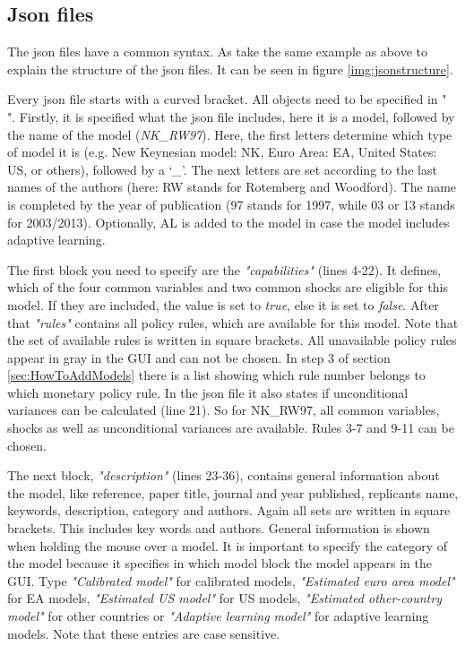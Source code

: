 \subsection*{Json files}
The json files have a common syntax. As take the same example as above to explain the structure of the json files. It can be seen in figure \ref{img:jsonstructure}.

Every json file starts with a curved bracket. All objects need to be specified in " ". Firstly, it is specified what the json file includes, here it is a model, followed by the name of the model (\textit{NK\_RW97}). Here, the first letters determine which type of model it is (e.g. New Keynesian model: NK, Euro Area: EA, United States: US, or others), followed by a `\textit{\_}'. The next letters are set according to the last names of the authors (here: RW stands for Rotemberg and Woodford). The name is completed by the year of publication (97 stands for 1997, while 03 or 13 stands for 2003/2013). Optionally, AL is added to the model in case the model includes adaptive learning. 

The first block you need to specify are the \textit{"capabilities"} (lines 4-22). It defines, which of the four common variables and two common shocks are eligible for this model. If they are included, the value is set to \textit{true}, else it is set to \textit{false}. After that \textit{"rules"} contains all policy rules, which are available for this model. Note that the set of available rules is written in square brackets. All unavailable policy rules appear in gray in the GUI and can not be chosen. In step 3 of section \ref{sec:HowToAddModels} there is a list showing which rule number belongs to which monetary policy rule. In the json file it also states if unconditional variances can be calculated (line 21). So for NK\_RW97, all common variables, shocks as well as unconditional variances are available. Rules 3-7 and 9-11 can be chosen. 

The next block, \textit{"description"} (lines 23-36), contains general information about the model, like reference, paper title, journal and year published, replicants name, keywords, description, category and authors. Again all sets are written in square brackets. This includes key words and authors. General information is shown when holding the mouse over a model. It is important to specify the category of the model because it specifies in which model block the model appears in the GUI. Type \textit{"Calibrated model"} for calibrated models, \textit{"Estimated euro area model"} for EA models, \textit{"Estimated US model"} for US models, \textit{"Estimated other-country model"} for other countries or \textit{"Adaptive learning model"} for adaptive learning models. Note that these entries are case sensitive.

